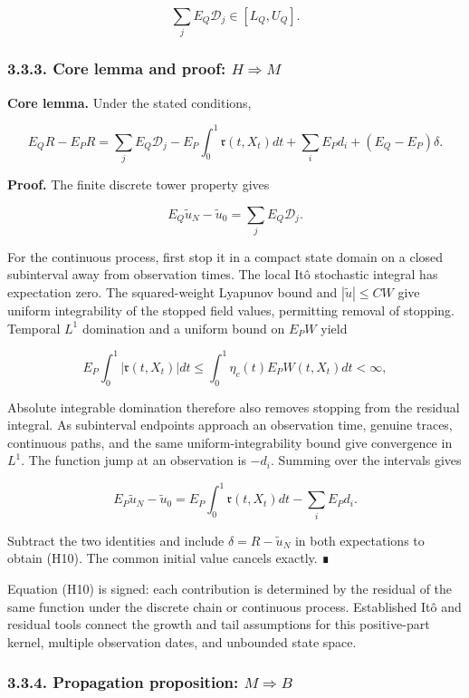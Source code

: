 \documentclass[a4paper,11pt]{article}
\begin{document}
\[
\sum_j E_Q\mathscr D_j\in[L_Q,U_Q].
\]

\subsubsection*{3.3.3. Core lemma and proof: $H\Rightarrow M$}

\textbf{Core lemma.} Under the stated conditions,

\[
\boxed{
E_QR-E_PR=
\sum_jE_Q\mathscr D_j
-E_P\int_0^1\mathfrak r(t,X_t)dt
+\sum_iE_Pd_i+(E_Q-E_P)\delta.}
\tag{H10}
\]

\textbf{Proof.} The finite discrete tower property gives

\[
E_Q\widetilde u_N-\widetilde u_0
=\sum_jE_Q\mathscr D_j.
\]

For the continuous process, first stop it in a compact state domain on a closed subinterval away from observation times. The local Itô stochastic integral has expectation zero. The squared-weight Lyapunov bound and \( |\widetilde u|\le CW\) give uniform integrability of the stopped field values, permitting removal of stopping. Temporal $L^1$ domination and a uniform bound on \(E_PW\) yield

\[
E_P\int_0^1|\mathfrak r(t,X_t)|dt
\le\int_0^1\eta_c(t)E_PW(t,X_t)dt<\infty,
\]

Absolute integrable domination therefore also removes stopping from the residual integral. As subinterval endpoints approach an observation time, genuine traces, continuous paths, and the same uniform-integrability bound give convergence in $L^1$. The function jump at an observation is $-d_i$. Summing over the intervals gives

\[
E_P\widetilde u_N-\widetilde u_0
=E_P\int_0^1\mathfrak r(t,X_t)dt-\sum_iE_Pd_i.
\]

Subtract the two identities and include $\delta=R-\widetilde u_N$ in both expectations to obtain (H10). The common initial value cancels exactly. ∎

Equation (H10) is signed: each contribution is determined by the residual of the same function under the discrete chain or continuous process. Established Itô and residual tools connect the growth and tail assumptions for this positive-part kernel, multiple observation dates, and unbounded state space.

\subsubsection*{3.3.4. Propagation proposition: $M\Rightarrow B$}
\end{document}
